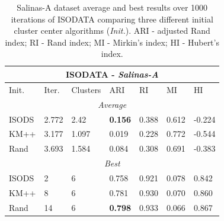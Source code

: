 \documentclass[a4paper, 10pt]{article}
\begin{document}
\begin{table}[ht]
      \caption{Salinas-A dataset average and best results over 1000 iterations
            of ISODATA comparing three different initial cluster center
            algorithms (\textit{Init.}). ARI - adjusted Rand index; RI - Rand
            index; MI - Mirkin's index; HI - Hubert's index.}
      \begin{tabular}{ |p{1.25cm}||p{1.25cm} p{1.25cm} p{1.25cm} p{1.25cm} p{1.25cm} p{1.25cm}|}
            \hline
            \multicolumn{7}{|c|}{\textbf{ISODATA} - \textit{Salinas-A}}        \\
            \hline
            Init. & Iter. & Clusters & ARI            & RI    & MI    & HI     \\
            \hline
            \multicolumn{7}{|c|}{\textit{Average}}                             \\
            \hline
            ISODS & 2.772 & 2.42     & \textbf{0.156} & 0.388 & 0.612 & -0.224 \\
            KM++  & 3.177 & 1.097    & 0.019          & 0.228 & 0.772 & -0.544 \\
            Rand  & 3.693 & 1.584    & 0.084          & 0.308 & 0.691 & -0.383 \\
            \hline
            \multicolumn{7}{|c|}{\textit{Best}}                                \\
            \hline
            ISODS & 2     & 6        & 0.758          & 0.921 & 0.078 & 0.842  \\
            KM++  & 8     & 6        & 0.781          & 0.930 & 0.070 & 0.860  \\
            Rand  & 14    & 6        & \textbf{0.798} & 0.933 & 0.066 & 0.867  \\
            \hline
      \end{tabular}
      \label{tab:salinastable}
\end{table}
\end{document}
